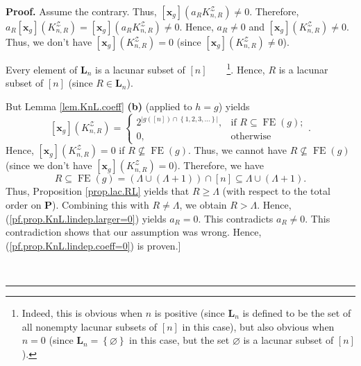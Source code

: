 \documentclass[numbers=enddot,12pt,final,onecolumn,notitlepage]{scrartcl}%
\theoremstyle{definition}
\newenvironment{proof}[1][Proof]{\noindent\textbf{#1.} }{\ \rule{0.5em}{0.5em}}
\newenvironment{verlong}{}{}
\begin{document}
\begin{proof}
\begin{verlong}
Assume the contrary. Thus, $\left[  \mathbf{x}_{g}\right]  \left(
a_{R}K_{n,R}^{\mathcal{Z}}\right)  \neq0$. Therefore, $a_{R}\left[
\mathbf{x}_{g}\right]  \left(  K_{n,R}^{\mathcal{Z}}\right)  =\left[
\mathbf{x}_{g}\right]  \left(  a_{R}K_{n,R}^{\mathcal{Z}}\right)  \neq0$.
Hence, $a_{R}\neq0$ and $\left[  \mathbf{x}_{g}\right]  \left(  K_{n,R}%
^{\mathcal{Z}}\right)  \neq0$. Thus, we don't have $\left[  \mathbf{x}%
_{g}\right]  \left(  K_{n,R}^{\mathcal{Z}}\right)  =0$ (since $\left[
\mathbf{x}_{g}\right]  \left(  K_{n,R}^{\mathcal{Z}}\right)  \neq0$).

Every element of $\mathbf{L}_{n}$ is a lacunar subset of $\left[  n\right]
$\ \ \ \ \footnote{Indeed, this is obvious when $n$ is positive (since
$\mathbf{L}_{n}$ is defined to be the set of all nonempty lacunar subsets of
$\left[  n\right]  $ in this case), but also obvious when $n=0$ (since
$\mathbf{L}_{n}=\left\{  \varnothing\right\}  $ in this case, but the set
$\varnothing$ is a lacunar subset of $\left[  n\right]  $).}. Hence, $R$ is a
lacunar subset of $\left[  n\right]  $ (since $R\in\mathbf{L}_{n}$).

But Lemma \ref{lem.KnL.coeff} \textbf{(b)} (applied to $h=g$) yields%
\[
\left[  \mathbf{x}_{g}\right]  \left(  K_{n,R}^{\mathcal{Z}}\right)  =%
\begin{cases}
2^{\left\vert g\left(  \left[  n\right]  \right)  \cap\left\{  1,2,3,\ldots
\right\}  \right\vert }, & \text{if }R\subseteq\operatorname*{FE}\left(
g\right)  ;\\
0, & \text{otherwise}%
\end{cases}
.
\]
Hence, $\left[  \mathbf{x}_{g}\right]  \left(  K_{n,R}^{\mathcal{Z}}\right)
=0$ if $R\not \subseteq \operatorname*{FE}\left(  g\right)  $. Thus, we cannot
have $R\not \subseteq \operatorname*{FE}\left(  g\right)  $ (since we don't
have $\left[  \mathbf{x}_{g}\right]  \left(  K_{n,R}^{\mathcal{Z}}\right)
=0$). Therefore, we have
\[
R\subseteq\operatorname*{FE}\left(  g\right)  =\left(  \Lambda\cup\left(
\Lambda+1\right)  \right)  \cap\left[  n\right]  \subseteq\Lambda\cup\left(
\Lambda+1\right)  .
\]
Thus, Proposition \ref{prop.lac.RL} yields that $R\geq\Lambda$ (with respect
to the total order on $\mathbf{P}$). Combining this with $R\neq\Lambda$, we
obtain $R>\Lambda$. Hence, (\ref{pf.prop.KnL.lindep.larger=0}) yields
$a_{R}=0$. This contradicts $a_{R}\neq0$. This contradiction shows that our
assumption was wrong. Hence, (\ref{pf.prop.KnL.lindep.coeff=0}) is proven.]
\end{verlong}


\end{proof}
\end{document}
